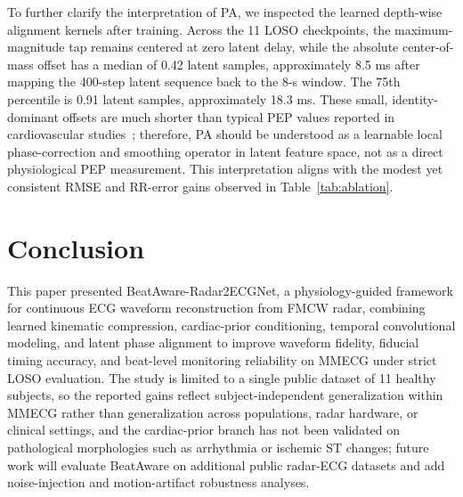 \documentclass[runningheads]{llncs}
\begin{document}
To further clarify the interpretation of PA, we inspected the learned depth-wise alignment kernels after training. Across the 11 LOSO checkpoints, the maximum-magnitude tap remains centered at zero latent delay, while the absolute center-of-mass offset has a median of 0.42 latent samples, approximately 8.5 ms after mapping the 400-step latent sequence back to the 8-s window. The 75th percentile is 0.91 latent samples, approximately 18.3 ms. These small, identity-dominant offsets are much shorter than typical PEP values reported in cardiovascular studies~\cite{pilz2023pep}; therefore, PA should be understood as a learnable local phase-correction and smoothing operator in latent feature space, not as a direct physiological PEP measurement. This interpretation aligns with the modest yet consistent RMSE and RR-error gains observed in Table~\ref{tab:ablation}.


\FloatBarrier


\section{Conclusion}

This paper presented BeatAware-Radar2ECGNet, a physiology-guided framework for continuous ECG waveform reconstruction from FMCW radar, combining learned kinematic compression, cardiac-prior conditioning, temporal convolutional modeling, and latent phase alignment to improve waveform fidelity, fiducial timing accuracy, and beat-level monitoring reliability on MMECG under strict LOSO evaluation. The study is limited to a single public dataset of 11 healthy subjects, so the reported gains reflect subject-independent generalization within MMECG rather than generalization across populations, radar hardware, or clinical settings, and the cardiac-prior branch has not been validated on pathological morphologies such as arrhythmia or ischemic ST changes; future work will evaluate BeatAware on additional public radar-ECG datasets and add noise-injection and motion-artifact robustness analyses.
\end{document}
